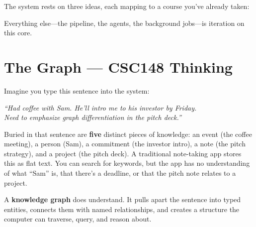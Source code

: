 \documentclass[11pt, letterpaper]{article}
\begin{document}
The system rests on three ideas, each mapping to a course you've already taken:

\begin{center}
\end{center}

Everything else---the pipeline, the agents, the background jobs---is iteration on this core.

\section{The Graph --- CSC148 Thinking}

Imagine you type this sentence into the system:

\begin{center}
\textit{``Had coffee with Sam. He'll intro me to his investor by Friday.\\Need to emphasize graph differentiation in the pitch deck.''}
\end{center}

Buried in that sentence are \textbf{five} distinct pieces of knowledge: an event (the coffee meeting), a person (Sam), a commitment (the investor intro), a note (the pitch strategy), and a project (the pitch deck). A traditional note-taking app stores this as flat text. You can search for keywords, but the app has no understanding of what ``Sam'' is, that there's a deadline, or that the pitch note relates to a project.

A \textbf{knowledge graph} does understand. It pulls apart the sentence into typed entities, connects them with named relationships, and creates a structure the computer can traverse, query, and reason about.
\end{document}
